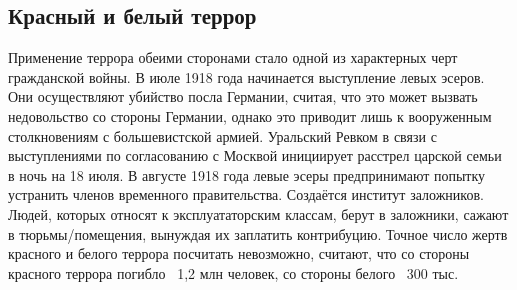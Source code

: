 \subsection{Красный и белый террор}

Применение террора обеими сторонами стало одной из характерных черт гражданской войны.
В июле 1918 года начинается выступление левых эсеров. Они осуществляют убийство посла Германии, считая, что это может вызвать недовольство со стороны Германии, однако это приводит лишь к вооруженным столкновениям с большевистской армией.
Уральский Ревком в связи с выступлениями по согласованию с Москвой инициирует расстрел царской семьи в ночь на 18 июля. 
В августе 1918 года левые эсеры предпринимают попытку устранить членов временного правительства.
Создаётся институт заложников. Людей, которых относят к эксплуататорским классам, берут в заложники, сажают в тюрьмы/помещения, вынуждая их заплатить контрибуцию. 
Точное число жертв красного и белого террора посчитать невозможно, считают, что со стороны красного террора погибло ~1,2 млн человек, со стороны белого ~300 тыс.
